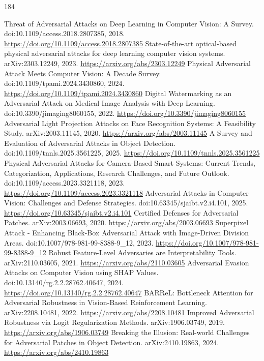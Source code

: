 \documentclass[11pt]{article}
\begin{document}
\begin{thebibliography}{184}
 Threat of Adversarial Attacks on Deep Learning in Computer Vision: A Survey. doi:10.1109/access.2018.2807385, 2018. \url{https://doi.org/10.1109/access.2018.2807385}
 State-of-the-art optical-based physical adversarial attacks for deep learning computer vision systems. arXiv:2303.12249, 2023. \url{https://arxiv.org/abs/2303.12249}
 Physical Adversarial Attack Meets Computer Vision: A Decade Survey. doi:10.1109/tpami.2024.3430860, 2024. \url{https://doi.org/10.1109/tpami.2024.3430860}
 Digital Watermarking as an Adversarial Attack on Medical Image Analysis with Deep Learning. doi:10.3390/jimaging8060155, 2022. \url{https://doi.org/10.3390/jimaging8060155}
 Adversarial Light Projection Attacks on Face Recognition Systems: A Feasibility Study. arXiv:2003.11145, 2020. \url{https://arxiv.org/abs/2003.11145}
 A Survey and Evaluation of Adversarial Attacks in Object Detection. doi:10.1109/tnnls.2025.3561225, 2025. \url{https://doi.org/10.1109/tnnls.2025.3561225}
 Physical Adversarial Attacks for Camera-Based Smart Systems: Current Trends, Categorization, Applications, Research Challenges, and Future Outlook. doi:10.1109/access.2023.3321118, 2023. \url{https://doi.org/10.1109/access.2023.3321118}
 Adversarial Attacks in Computer Vision: Challenges and Defense Strategies. doi:10.63345/sjaibt.v2.i4.101, 2025. \url{https://doi.org/10.63345/sjaibt.v2.i4.101}
 Certified Defenses for Adversarial Patches. arXiv:2003.06693, 2020. \url{https://arxiv.org/abs/2003.06693}
 Superpixel Attack - Enhancing Black-Box Adversarial Attack with Image-Driven Division Areas. doi:10.1007/978-981-99-8388-9\_12, 2023. \url{https://doi.org/10.1007/978-981-99-8388-9_12}
 Robust Feature-Level Adversaries are Interpretability Tools. arXiv:2110.03605, 2021. \url{https://arxiv.org/abs/2110.03605}
 Adversarial Evasion Attacks on Computer Vision using SHAP Values. doi:10.13140/rg.2.2.28762.40647, 2024. \url{https://doi.org/10.13140/rg.2.2.28762.40647}
 BARReL: Bottleneck Attention for Adversarial Robustness in Vision-Based Reinforcement Learning. arXiv:2208.10481, 2022. \url{https://arxiv.org/abs/2208.10481}
 Improved Adversarial Robustness via Logit Regularization Methods. arXiv:1906.03749, 2019. \url{https://arxiv.org/abs/1906.03749}
 Breaking the Illusion: Real-world Challenges for Adversarial Patches in Object Detection. arXiv:2410.19863, 2024. \url{https://arxiv.org/abs/2410.19863}

\end{thebibliography}
\end{document}
